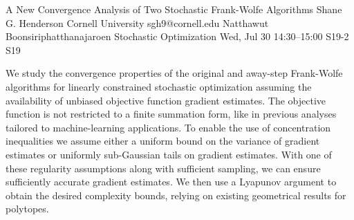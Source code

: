 \documentclass[12pt,lettersize,oneside]{book} %
\begin{document}
\begin{talk}
  {A New Convergence Analysis of Two Stochastic Frank-Wolfe Algorithms}%
  {Shane G. Henderson}%
  {Cornell University}%
  {sgh9@cornell.edu}%
  {Natthawut Boonsiriphatthanajaroen}%
  {Stochastic Optimization}%
  {Wed, Jul 30 14:30--15:00}%
  {S19-2}%
  {S19}%
    
   
We study the convergence properties of the original and away-step
Frank-Wolfe algorithms for linearly constrained stochastic
optimization assuming the availability of unbiased objective function
gradient estimates. The objective function is not restricted to a
finite summation form, like in previous analyses tailored to
machine-learning applications. To enable the use of concentration
inequalities we assume either a uniform bound on the variance of
gradient estimates or uniformly sub-Gaussian tails on gradient
estimates. With one of these regularity assumptions along with
sufficient sampling, we can ensure sufficiently accurate gradient
estimates. We then use a Lyapunov argument to obtain the desired
complexity bounds, relying on existing geometrical results for
polytopes. 
\end{talk}
\end{document}
